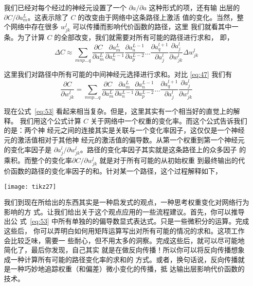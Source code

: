 我们已经对每个经过的神经元设置了一个 $\partial a/\partial a$ 这种形式的项，还有输
出层的 $\partial C/\partial a_m^L$。这表示除了 $C$ 的改变由于网络中这条路径上激活
值的变化。当然，整个网络中存在很多 $w_{jk}^l$ 可以传播而影响代价函数的路径，这里
我们就看其中一条。为了计算 $C$ 的全部改变，我们就需要对所有可能的路径进行求和，
即，
\begin{equation}
  \Delta C \approx \sum_{mnp\ldots q} \frac{\partial C}{\partial a^L_m}
  \frac{\partial a^L_m}{\partial a^{L-1}_n} \frac{\partial a^{L-1}_n}{\partial
    a^{L-2}_p} \ldots \frac{\partial a^{l+1}_q}{\partial a^l_j} \frac{\partial
    a^l_j}{\partial w^l_{jk}} \Delta w^l_{jk}
  \label{eq:52}\tag{52}
\end{equation}

这里我们对路径中所有可能的中间神经元选择进行求和。对比 \eqref{eq:47} 我们有
\begin{equation}
  \frac{\partial C}{\partial w^l_{jk}} = \sum_{mnp\ldots q} \frac{\partial
    C}{\partial a^L_m} \frac{\partial a^L_m}{\partial a^{L-1}_n} \frac{\partial
    a^{L-1}_n}{\partial a^{L-2}_p} \ldots \frac{\partial a^{l+1}_q}{\partial
    a^l_j} \frac{\partial a^l_j}{\partial w^l_{jk}}
\label{eq:53}\tag{53}
\end{equation}

现在公式~\eqref{eq:53} 看起来相当复杂。但是，这里其实有一个相当好的直觉上的解释。
我们用这个公式计算 $C$ 关于网络中一个权重的变化率。而这个公式告诉我们的是：两个神
经元之间的连接其实是关联与一个变化率因子，这仅仅是一个神经元的激活值相对于其他神
经元的激活值的偏导数。从第一个权重到第一个神经元的变化率因子是
$\partial a_j^l/\partial w_{jk}^l$。路径的变化率因子其实就是这条路径上的众多因子
的乘积。而整个的变化率$\partial C/\partial w_{jk}^l$ 就是对于所有可能的从初始权重
到最终输出的代价函数的路径的变化率因子的和。针对某一个路径，这个过程解释如下，

\begin{center}
  \texttt{[image: tikz27]}
\end{center}

我们到现在所给出的东西其实是一种启发式的观点，一种思考权重变化对网络行为影响的方
式。让我们给出关于这个观点应用的一些流程建议。首先，你可以推导出公
式~\eqref{eq:53} 中所有单独的的偏导数显式表达式。只是一些微积分的运算。完成这些后，
你可以弄明白如何用矩阵运算写出对所有可能的情况的求和。这项工作会比较乏味，需要一
些耐心，但不用太多的洞察。完成这些后，就可以尽可能地简化了，最后你发现，自己其实
就是在做反向传播！所以你可以将反向传播想象成一种计算所有可能的路径变化率的求和的
方式。或者，换句话说，反向传播就是一种巧妙地追踪权重（和偏差）微小变化的传播，抵
达输出层影响代价函数的技术。

